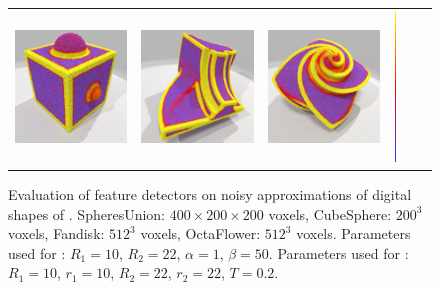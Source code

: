 \begin{figure}[ht]
\begin{center}
\begin{tabular}{l c c c cl}
      \includegraphics[width=4.0cm]{images/Feature/CubeSphere_noise_VCM_r_22} &
      \includegraphics[width=4.0cm]{images/Feature/Fandisk_noise_VCM_r_22} &
      \includegraphics[width=4.0cm]{images/Feature/OctaFlower_512_noise_VCM_r_22} &
      \includegraphics[width=0.1cm,height=4cm]{images/YMTB6W}
    \end{tabular}
    \caption[Evaluation of feature detectors on noisy approximations of digital shapes of ]{Evaluation of feature detectors on noisy approximations of digital shapes of .
    SpheresUnion: $400 \times 200 \times 200$ voxels, CubeSphere: $200^3$ voxels, Fandisk: $512^3$ voxels, OctaFlower: $512^3$ voxels.
    Parameters used for \cite{Telea2004}: $R_1 = 10$, $R_2 = 22$, $\alpha = 1$, $\beta = 50$.
    Parameters used for \cite{Merigot2011}: $R_1 = 10$, $r_1 = 10$, $R_2 = 22$, $r_2 = 22$, $T = 0.2$.\label{fig:feature-comparative-noise}}
  \end{center}
\end{figure}
